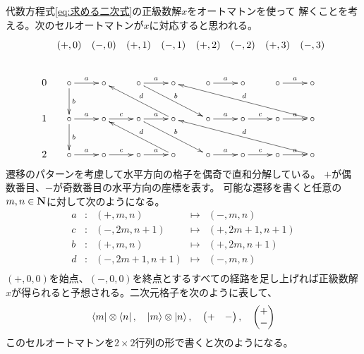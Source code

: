 {	代数方程式\eqref{eq:求める二次式}の正級数解$x$をオートマトンを使って
	解くことを考える。次のセルオートマトンが$x$に対応すると思われる。
	\begin{equation*}\xymatrix@C=1ex{
		& (+,0) & (-,0) & (+,1) & (-,1) & (+,2) & (-,2) & (+,3) & (-,3) \\
		0 & \circ \ar[r]^a \ar[d]^b & \circ & \circ \ar[r]^a  \ar[drr]^b 
			& \circ & \circ \ar[r]^a & \circ & \circ \ar[r]^a & \circ  \\
		1 & \circ \ar[r]^a \ar[d]^b & \circ \ar[r]^c 
			& \circ \ar[r]^a \ar[drr]^b & \circ \ar[ull]_d
			& \circ \ar[r]^a & \circ \ar[r]^c & \circ \ar[r]^a
			& \circ \ar[ullll]_d \\
		2 & \circ \ar[r]^a & \circ \ar[r]^c & \circ \ar[r]^a 
			& \circ \ar[ull]_d 
			& \circ \ar[r]^a & \circ \ar[r]^c & \circ \ar[r]^a
			& \circ \ar[ullll]_d 
	}\end{equation*}
	遷移のパターンを考慮して水平方向の格子を偶奇で直和分解している。
	$+$が偶数番目、$-$が奇数番目の水平方向の座標を表す。
	可能な遷移を書くと任意の$m,n\in\mathbf{N}$に対して次のようになる。
	\begin{equation*}\begin{array}{rcrcl}
		a &:& (+, m, n) &\mapsto& (-, m, n) \\
		c &:& (-, 2m, n + 1) &\mapsto& (+, 2m + 1, n + 1) \\
		b &:& (+, m, n) &\mapsto& (+, 2m, n + 1) \\
		d &:& (-, 2m + 1, n + 1) &\mapsto& (-, m, n) \\
	\end{array}\end{equation*}
	$(+,0,0)$を始点、$(-,0,0)$を終点とするすべての経路を足し上げれば正級数解
	$x$が得られると予想される。二次元格子を次のように表して、
	\begin{equation*}\begin{split}
		\mathinner{\langle{m}|}\otimes\mathinner{\langle{n}|}
		,\quad \mathinner{|{m}\rangle}\otimes\mathinner{|{n}\rangle}
		,\quad \begin{pmatrix}
			+ & -
		\end{pmatrix},\quad\begin{pmatrix}
			+ \\ -
		\end{pmatrix}
	\end{split}\end{equation*}
	このセルオートマトンを$2\times2$行列の形で書くと次のようになる。
	\begin{equation}\label{eq:セルオートマトンでの真空期待値}\begin{split}

\end{split}
\end{equation}}
